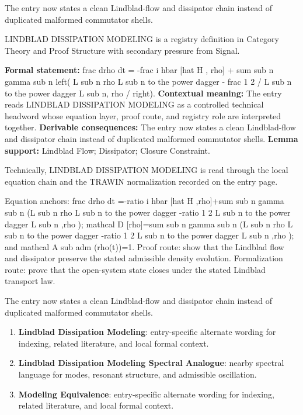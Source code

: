 The entry now states a clean Lindblad-flow and dissipator chain instead of duplicated malformed commutator shells.
\clearpage


\begingroup\small
{}
LINDBLAD DISSIPATION MODELING is a registry definition in Category Theory and Proof Structure with secondary pressure from Signal.

\begingroup\footnotesize\setlength{\emergencystretch}{3em}\sloppy
\textbf{Formal statement:} frac drho dt = -frac i hbar [hat H , rho] + sum sub n gamma sub n left( L sub n rho L sub n to the power dagger - frac 1 2 / L sub n to the power dagger L sub n, rho / right). \textbf{Contextual meaning:} The entry reads LINDBLAD DISSIPATION MODELING as a controlled technical headword whose equation layer, proof route, and registry role are interpreted together. \textbf{Derivable consequences:} The entry now states a clean Lindblad-flow and dissipator chain instead of duplicated malformed commutator shells. \textbf{Lemma support:} Lindblad Flow; Dissipator; Closure Constraint.\par
\endgroup

Technically, LINDBLAD DISSIPATION MODELING is read through the local equation chain and the TRAWIN normalization recorded on the entry page.

Equation anchors: frac drho dt =-ratio i hbar [hat H ,rho]+sum sub n gamma sub n (L sub n rho L sub n to the power dagger -ratio 1 2 L sub n to the power dagger L sub n ,rho ); mathcal D [rho]=sum sub n gamma sub n (L sub n rho L sub n to the power dagger -ratio 1 2 L sub n to the power dagger L sub n ,rho ); and mathcal A sub adm (rho(t))=1. Proof route: show that the Lindblad flow and dissipator preserve the stated admissible density evolution. Formalization route: prove that the open-system state closes under the stated Lindblad transport law.

The entry now states a clean Lindblad-flow and dissipator chain instead of duplicated malformed commutator shells.
\endgroup

\begin{enumerate}[leftmargin=1.6em,itemsep=6pt,topsep=4pt]
\item \textbf{Lindblad Dissipation Modeling}: entry-specific alternate wording for indexing, related literature, and local formal context.
\item \textbf{Lindblad Dissipation Modeling Spectral Analogue}: nearby spectral language for modes, resonant structure, and admissible oscillation.
\item \textbf{Modeling Equivalence}: entry-specific alternate wording for indexing, related literature, and local formal context.
\end{enumerate}

